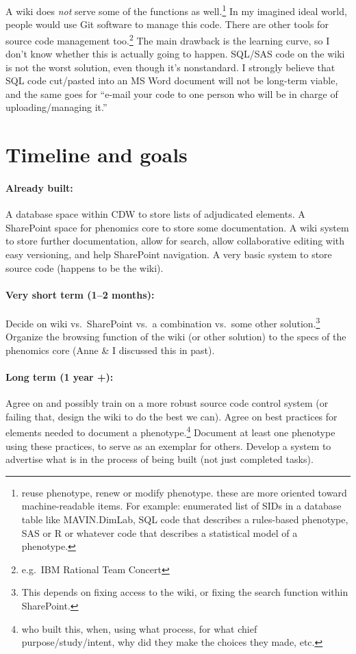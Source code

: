 \documentclass{tufte-handout}
\begin{document}
A wiki does \emph{not} serve some of the functions as
well.\footnote{reuse phenotype, renew or modify phenotype. these are
  more oriented toward machine-readable items. For example: enumerated
  list of SIDs in a database table like MAVIN.DimLab, SQL code that
  describes a rules-based phenotype, SAS or R or whatever code that
  describes a statistical model of a phenotype.} In my imagined ideal
world, people would use Git software to manage this code. There are
other tools for source code management too.\footnote{e.g.\ IBM
  Rational Team Concert} The main drawback is the learning curve, so I
don't know whether this is actually going to happen. SQL/SAS code on
the wiki is not the worst solution, even though it's nonstandard. I
strongly believe that SQL code cut/pasted into an MS Word document
will not be long-term viable, and the same goes for ``e-mail your code
to one person who will be in charge of uploading/managing it.''

\section{Timeline and goals}

\paragraph{Already built:} A database space within CDW to store lists
of adjudicated elements. A SharePoint space for phenomics core to store
some documentation. A wiki system to store further documentation, allow
for search, allow collaborative editing with easy versioning, and help
SharePoint navigation. A very basic system to store source code (happens
to be the wiki).

\paragraph{Very short term (1--2 months):} Decide on wiki vs.\ SharePoint
vs.\ a combination vs.\ some other solution.\footnote{This depends on fixing access
  to the wiki, or fixing the search function within SharePoint.} Organize the browsing
function of the wiki (or other solution) to the specs of the phenomics
core (Anne \& I discussed this in past).

\paragraph{Long term (1 year +):} Agree on and possibly train on a more
robust source code control system (or failing that, design the wiki to do
the best we can). Agree on best practices for elements needed to document
a phenotype.\footnote{who built this, when, using what process, for
  what chief purpose/study/intent, why did they make the choices they
  made, etc.} Document at least one phenotype using these practices,
to serve as an exemplar for others. Develop a system to advertise what is in the
process of being built (not just completed tasks).
\end{document}
